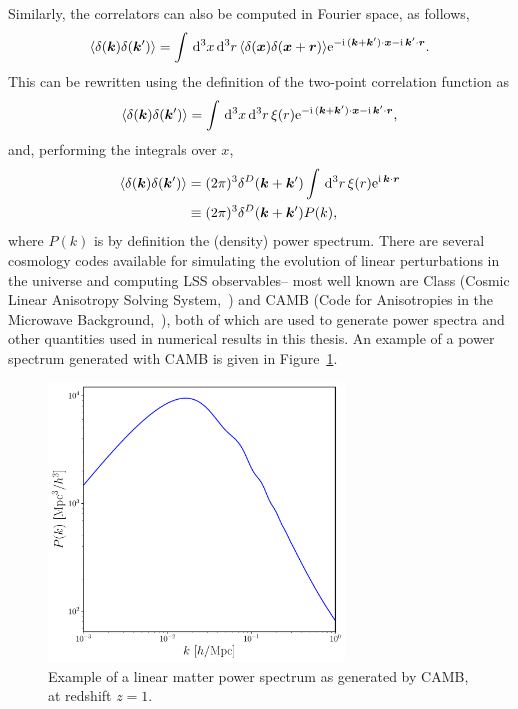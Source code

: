 Similarly, the correlators can also be computed in Fourier space, as follows, 
\begin{equation}
	\langle \delta(\bm {k}) \delta(\bm {k}') \rangle = \int \,\mathrm{d}^3 x \,\mathrm{d}^3 r \, \langle \delta(\bm {x}) \delta(\bm {x} + \bm{r})\rangle \mathrm{e}^{-\mathrm{i\,} (\bm {k} + \bm {k}') \cdot \bm {x} - \mathrm{i\,} \bm {k}' \cdot \bm{r}}.
\end{equation}
This can be rewritten using the definition of the two-point correlation function as 
\begin{equation}
	\langle \delta(\bm {k}) \delta(\bm {k}') \rangle = \int \,\mathrm{d}^3 x \,\mathrm{d}^3 r \, \xi(r) \mathrm{e}^{-\mathrm{i\,} (\bm {k} + \bm {k}') \cdot \bm {x} - \mathrm{i\,} \bm {k}' \cdot \bm{r}},
\end{equation}
and, performing the integrals over $x$, 
\begin{align}
	\langle \delta(\bm {k}) \delta(\bm {k}') \rangle &= (2\pi)^3 \delta^D(\bm {k} + \bm {k}') \int \,\mathrm{d}^3 r \,\xi(r) \mathrm{e}^{\mathrm{i\,} \bm {k} \cdot \bm{r}} \\
	&\equiv (2\pi)^3 \delta^D(\bm {k} + \bm {k}') P(k),
\end{align}
where $P(k)$ is by definition the (density) power spectrum. There are several cosmology codes available for simulating the evolution of linear perturbations in the universe and computing LSS observables-- most well known are Class (Cosmic Linear Anisotropy Solving System,~\cite{Lesgourgues:2011}) and CAMB (Code for Anisotropies in the Microwave Background,~\cite{Lewis:1999bs}), both of which are used to generate power spectra and other quantities used in numerical results in this thesis. An example of a power spectrum generated with CAMB is given in Figure~\ref{fig:powerspectrum}.
\begin{figure}[!ht]
	\centering
	\includegraphics[width=0.7\textwidth]{fig/matterpower_z1.pdf}
	\caption{Example of a linear matter power spectrum as generated by CAMB, at redshift $z=1$.}
	\label{fig:powerspectrum}
\end{figure}

